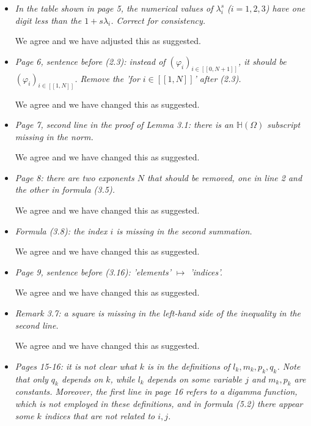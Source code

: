 \documentclass[11 pt]{article}
\numberwithin{equation}{section}
\begin{document}
\begin{itemize}
    \item \emph{In the table shown in page 5, the numerical values of \(\lambda_{i}^{s}\) (\(i=1,2,3\)) have one digit less than the \(1+s\lambda_{i}\). Correct for consistency.}

    We agree and we have adjusted this as suggested.

    \item \emph{Page 6, sentence before (2.3): instead of \((\varphi_{i})_{i\in[[0,N+1]]}\), it should be \((\varphi_{i})_{i\in[[1,N]]}\). Remove the 'for \(i\in[[1,N]]\)' after (2.3).}

    We agree and we have changed this as suggested.

    \item \emph{Page 7, second line in the proof of Lemma 3.1: there is an \({\mathbb{H}}(\Omega)\) subscript missing in the norm.}

    We agree and we have changed this as suggested.

    \item \emph{Page 8: there are two exponents \(N\) that should be removed, one in line 2 and the other in formula (3.5).}

        We agree and we have changed this as suggested.

    \item \emph{Formula (3.8): the index \(i\) is missing in the second summation.}

    We agree and we have changed this as suggested.

    \item \emph{Page 9, sentence before (3.16): 'elements' \(\mapsto\) 'indices'.}

    We agree and we have changed this as suggested.

    \item \emph{Remark 3.7: a square is missing in the left-hand side of the inequality in the second line.}

    We agree and we have changed this as suggested.

    \item \emph{Pages 15-16: it is not clear what \(k\) is in the definitions of \(l_{k},m_{k},p_{k},q_{k}\). Note that only \(q_{k}\) depends on \(k\), while \(l_{k}\) depends on some variable \(j\) and \(m_{k},p_{k}\) are constants. Moreover, the first line in page 16 refers to a digamma function, which is not employed in these definitions, and in formula (5.2) there appear some \(k\) indices that are not related to \(i,j\).}


\end{itemize}
\end{document}
